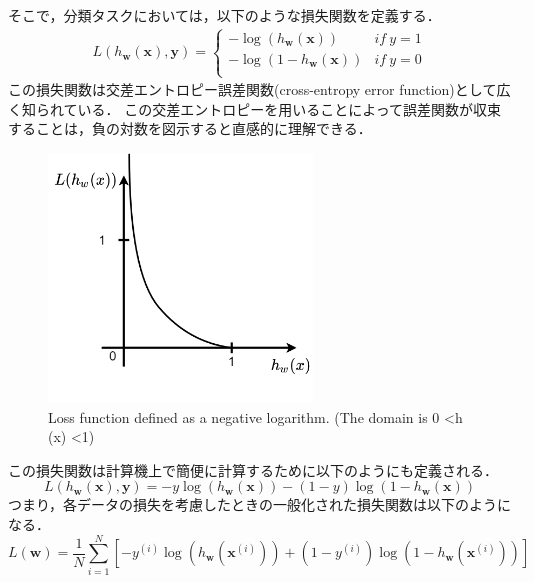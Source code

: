     そこで，分類タスクにおいては，以下のような損失関数を定義する．
    \begin{eqnarray}
        L\left(h_{\bm{w}}(\bm{x}), \bm{y}\right)=\left\{ \begin{array}{ll}
            -\log(h_{\bm{w}}(\bm{x})) & if\ y=1 \\
            -\log(1-h_{\bm{w}}(\bm{x})) & if\ y=0 \\
            \end{array} \right.
    \end{eqnarray}
    この損失関数は交差エントロピー誤差関数(cross-entropy error function)として広く知られている．
    この交差エントロピーを用いることによって誤差関数が収束することは，負の対数を図示すると直感的に理解できる．
    \begin{figure}[ht]
        \begin{center}
            \includegraphics[width=7.0cm]{./8_appendix/img/log_negative}
            \caption{Loss function defined as a negative logarithm. (The domain is 0 <h (x) <1)}
        \end{center}
    \end{figure}
    
    この損失関数は計算機上で簡便に計算するために以下のようにも定義される．
    \begin{equation}
        L\left(h_{\bm{w}}(\bm{x}), \bm{y}\right)= -y \log(h_{\bm{w}}(\bm{x})) -(1-y)\log(1-h_{\bm{w}}(\bm{x}))
    \end{equation}
    つまり，各データの損失を考慮したときの一般化された損失関数は以下のようになる．
    \begin{equation}
        L(\boldsymbol{w}) = \frac{1}{N}\sum^N_{i=1}\left[-y^{(i)} \log(h_{\bm{w}}(\bm{x}^{(i)})) +(1-y^{(i)})\log(1-h_{\bm{w}}(\bm{x}^{(i)}))\right]
    \end{equation}
    
